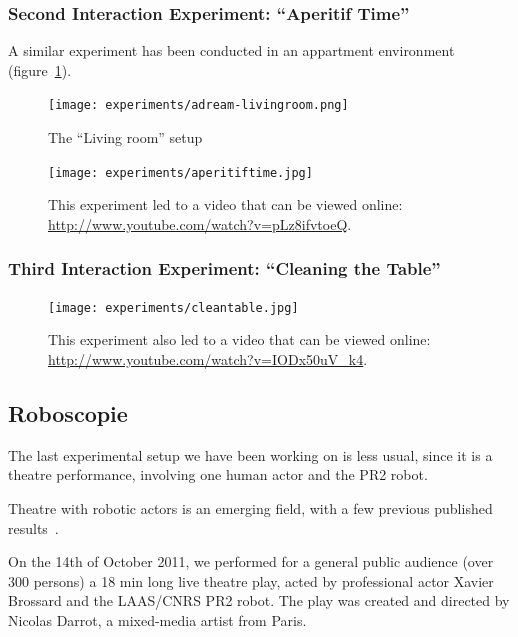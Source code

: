 \subsubsection{Second Interaction Experiment: ``Aperitif Time''}
\label{sect|expe2}

A similar experiment has been conducted in an appartment environment
(figure~\ref{fig|livingroom}).


\begin{figure}
    \centering
    \texttt{[image: experiments/adream-livingroom.png]}
    \caption{The ``Living room'' setup}
    \label{fig|livingroom}
\end{figure}


\begin{figure}
    \centering
    \texttt{[image: experiments/aperitiftime.jpg]}
    \caption{This experiment led to a video that can be viewed online:
\url{http://www.youtube.com/watch?v=pLz8ifvtoeQ}.}
    \label{fig|aperitif-video}
\end{figure}



\subsubsection{Third Interaction Experiment: ``Cleaning the Table''}
\label{sect|expe3}

\begin{figure}
    \centering
    \texttt{[image: experiments/cleantable.jpg]}
    \caption{This experiment also led to a video that can be viewed online:
    \url{http://www.youtube.com/watch?v=IODx50uV_k4}.}
    \label{fig|cleantable-video}
\end{figure}







\subsection{Roboscopie}
\label{sect|roboscopie}

The last experimental setup we have been working on is less usual, since it is
a theatre performance, involving one human actor and the PR2 robot.

Theatre with robotic actors is an emerging field, with a few previous published
results~\cite{Breazeal2003, Lin2009, Mavridis2009}.

On the 14th of October 2011, we performed for a general public audience (over
300 persons) a 18 min long live theatre play, acted by professional actor
Xavier Brossard and the LAAS/CNRS PR2 robot. The play was created and directed
by Nicolas Darrot, a mixed-media artist from Paris.

